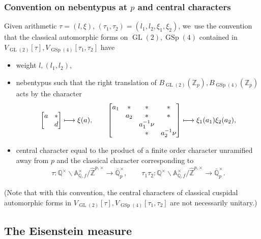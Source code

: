 \documentclass[10pt]{amsart}
\let\Subsection\subsection
\newcommand\mto{\mathchoice{\longmapsto}{\mapsto}{\mapsto}{\mapsto}}
\theoremstyle{plain}
\theoremstyle{remark}
\newcommand{\bA}{\mathbb{A}}
\newcommand{\bQ}{\mathbb{Q}}
\newcommand{\bZ}{\mathbb{Z}}
\DeclareMathOperator{\GL}{GL}
\DeclareMathOperator{\GSp}{GSp}
\begin{document}
\subsubsection{Convention on nebentypus at \texorpdfstring{$p$}{p} and central characters}
Given arithmetic $\tau=(l,\xi)$, $(\tau_1,\tau_2)=(l_1,l_2,\xi_1,\xi_2)$, we~use the convention that the classical automorphic forms on $\GL(2),\GSp(4)$ contained in $V_{\GL(2)}[\tau],V_{\GSp(4)}[\tau_1,\tau_2]$ have
\begin{itemize}
\item
weight $l,(l_1,l_2)$,
\item
nebentypus such that the right translation of $B_{\GL(2)}(\bZ_p),B_{\GSp(4)}(\bZ_p)$ acts by the character
\begin{align}
\label{eq:pneben}
\arraycolsep4.5pt
\begin{bmatrix}a&\ast\\ &d\end{bmatrix}
\mto
\xi(a),
\qquad
\begin{bmatrix} a_1&\ast&\ast&\ast\\&a_2&\ast&\ast\\ && a^{-1}_1\nu\\ &&\ast& a^{-1}_2\nu\end{bmatrix}
\mto
\xi_1(a_1)\xi_2(a_2),
\end{align}
\item
central character equal to the product of a finite order character unramified away from $p$ and the classical character corresponding to
\begin{align*}
\tau:\bQ^\times\backslash \bA^\times_{\bQ,f}/\hat{\bZ}^{p,\times}\to \bar{\bQ}^\times_p,
\qquad\tau_1\tau_2:\bQ^\times\backslash \bA^\times_{\bQ,f}/\hat{\bZ}^{p,\times}\to \bar{\bQ}^\times_p.
\end{align*}
\end{itemize}
(Note that with this convention, the central characters of classical cuspidal automorphic forms in $V_{\GL(2)}[\tau],V_{\GSp(4)}[\tau_1,\tau_2]$ are not necessarily unitary.)

\Subsection{The Eisenstein measure}\label{sec:EisMeas}
\end{document}
